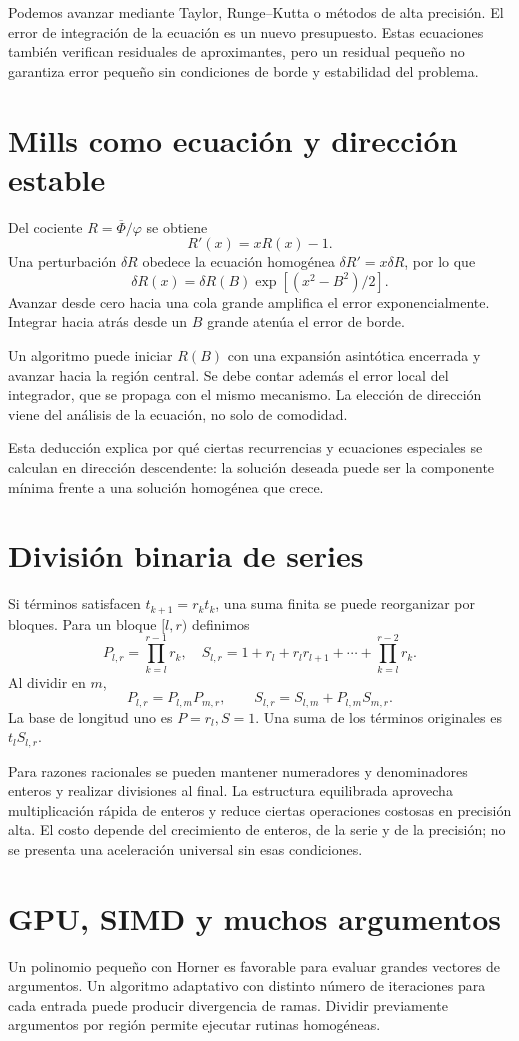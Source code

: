 \documentclass[11pt,a4paper]{article}
\theoremstyle{definition}
\newcommand{\ph}{\varphi}
\newcommand{\Q}{\overline\Phi}
\newcounter{problema}
\begin{document}
Podemos avanzar mediante Taylor, Runge--Kutta o métodos de alta precisión. El error de integración de la ecuación es un nuevo presupuesto. Estas ecuaciones también verifican residuales de aproximantes, pero un residual pequeño no garantiza error pequeño sin condiciones de borde y estabilidad del problema.

\section{Mills como ecuación y dirección estable}
Del cociente $R=\Q/\ph$ se obtiene
\[
R'(x)=xR(x)-1.
\]
Una perturbación $\delta R$ obedece la ecuación homogénea
$\delta R'=x\delta R$, por lo que
\[
\delta R(x)=\delta R(B)\exp[(x^2-B^2)/2].
\]
Avanzar desde cero hacia una cola grande amplifica el error exponencialmente. Integrar hacia atrás desde un $B$ grande atenúa el error de borde.

Un algoritmo puede iniciar $R(B)$ con una expansión asintótica encerrada y avanzar hacia la región central. Se debe contar además el error local del integrador, que se propaga con el mismo mecanismo. La elección de dirección viene del análisis de la ecuación, no solo de comodidad.

Esta deducción explica por qué ciertas recurrencias y ecuaciones especiales se calculan en dirección descendente: la solución deseada puede ser la componente mínima frente a una solución homogénea que crece.

\section{División binaria de series}
Si términos satisfacen $t_{k+1}=r_kt_k$, una suma finita se puede reorganizar por bloques. Para un bloque $[l,r)$ definimos
\[
P_{l,r}=\prod_{k=l}^{r-1}r_k,\quad
S_{l,r}=1+r_l+r_lr_{l+1}+\cdots+\prod_{k=l}^{r-2}r_k.
\]
Al dividir en $m$,
\[
P_{l,r}=P_{l,m}P_{m,r},\qquad
S_{l,r}=S_{l,m}+P_{l,m}S_{m,r}.
\]
La base de longitud uno es $P=r_l,S=1$. Una suma de los términos originales es $t_lS_{l,r}$.

Para razones racionales se pueden mantener numeradores y denominadores enteros y realizar divisiones al final. La estructura equilibrada aprovecha multiplicación rápida de enteros y reduce ciertas operaciones costosas en precisión alta. El costo depende del crecimiento de enteros, de la serie y de la precisión; no se presenta una aceleración universal sin esas condiciones.

\section{GPU, SIMD y muchos argumentos}
Un polinomio pequeño con Horner es favorable para evaluar grandes vectores de argumentos. Un algoritmo adaptativo con distinto número de iteraciones para cada entrada puede producir divergencia de ramas. Dividir previamente argumentos por región permite ejecutar rutinas homogéneas.
\end{document}
